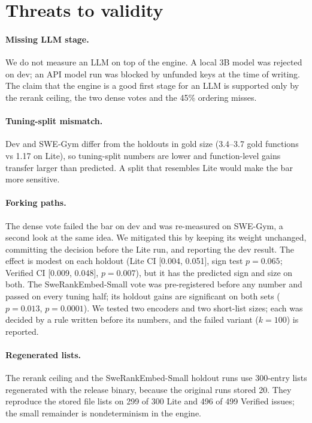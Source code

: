 \documentclass[10pt,twocolumn]{article}
\begin{document}
\section{Threats to validity}
\label{sec:threats}

\paragraph{Missing LLM stage.}
We do not measure an LLM on top of the engine. A local 3B model was rejected on dev; an API model run
was blocked by unfunded keys at the time of writing. The claim that the engine is a good first stage
for an LLM is supported only by the rerank ceiling, the two dense votes and the 45\% ordering
misses.

\paragraph{Tuning-split mismatch.}
Dev and SWE-Gym differ from the holdouts in gold size (3.4--3.7 gold functions vs 1.17 on Lite), so
tuning-split numbers are lower and function-level gains transfer larger than predicted. A split that
resembles Lite would make the bar more sensitive.

\paragraph{Forking paths.}
The dense vote failed the bar on dev and was re-measured on SWE-Gym, a second look at the same idea.
We mitigated this by keeping its weight unchanged, committing the decision before the Lite run, and
reporting the dev result. The effect is modest on each holdout (Lite CI [0.004, 0.051], sign test
$p=0.065$; Verified CI [0.009, 0.048], $p=0.007$), but it has the predicted sign and size on both.
The SweRankEmbed-Small vote was pre-registered before any number and passed on every tuning half;
its holdout gains are significant on both sets ($p=0.013$, $p=0.0001$). We tested two encoders and
two short-list sizes; each was decided by a rule written before its numbers, and the failed variant
($k=100$) is reported.

\paragraph{Regenerated lists.}
The rerank ceiling and the SweRankEmbed-Small holdout runs use 300-entry lists regenerated with the
release binary, because the original runs stored 20. They reproduce the stored file lists on 299 of
300 Lite and 496 of 499 Verified issues; the small remainder is nondeterminism in the engine.
\end{document}

